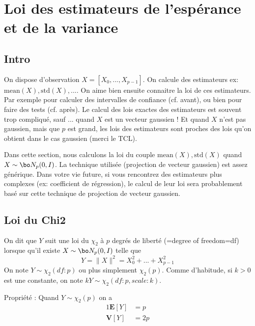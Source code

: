 \documentclass{article}
\def\std{\text{std}}
\def\mean{\mathrm{mean}}
\begin{document}
 
 
 
 
 
 \section{Loi des estimateurs de l'espérance et de la variance}
  
 
 \subsection{Intro}
 
On dispose d'observation $X=[X_0,...,X_{p-1}]$. On calcule des estimateurs ex: $\mean(X), \std(X),...$. On aime bien ensuite connaitre la loi de ces estimateurs. Par exemple pour calculer des intervalles de confiance (cf. avant), ou bien pour faire des tests (cf. après).  Le calcul des lois exactes des estimateurs est souvent trop compliqué, sauf ...  quand  $X$ est un vecteur gaussien !  Et quand $X$ n'est pas gaussien, mais que $p$ est grand, les lois des estimateurs sont proches des lois qu'on obtient dans le cas gaussien (merci le TCL). 
 
 
Dans cette section, nous calculons la loi du couple  $\mean(X), \std(X)$ quand $X\sim \bo N_p(0,I)$.  La technique utilisée (projection de vecteur gaussien) est assez générique. Dans votre vie future, si vous rencontrez des estimateurs plus complexes (ex: coefficient de régression), le calcul de leur loi sera probablement basé sur cette technique de projection de vecteur gaussien. 
  
  
  
\subsection{Loi du Chi2}


On dit que $Y$ suit une loi du $\chi_2$ à $p$ degrés de liberté (=degree of freedom=df)  lorsque qu'il existe $X \sim \bo N_p(0,I)$ telle que
$$
Y = \|X\|^2= X_0^2 + ...+ X_{p-1}^2   
$$
On note $Y \sim \chi_2(df:p)$ ou plus simplement $\chi_2(p)$.   Comme d'habitude, si $k>0$ est une constante, on note $kY \sim \chi_2(df:p,scale:k)$.


Propriété : Quand $Y \sim \chi_2(p)$ on a 
 \begin{alignat}{1}
 \mathbf E[Y] &=  p \\
 \mathbf V[ Y] &= 2p 
 \end{alignat}
\end{document}
